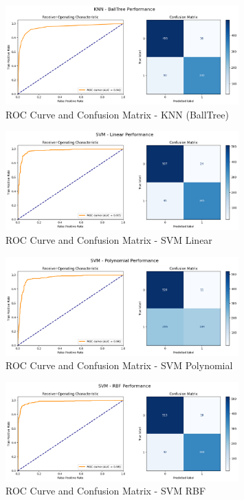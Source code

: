 \documentclass[12pt]{article}
\begin{document}
\begin{figure}[h!]
\centering
\includegraphics[width=0.8\textwidth]{images/knn6.png}
\caption{ROC Curve and Confusion Matrix - KNN (BallTree)}
\end{figure}

\begin{figure}[h!]
\centering
\includegraphics[width=0.8\textwidth]{images/svm1.png}
\caption{ROC Curve and Confusion Matrix - SVM Linear }
\end{figure}

\begin{figure}[h!]
\centering
\includegraphics[width=0.8\textwidth]{images/svm2.png}
\caption{ROC Curve and Confusion Matrix - SVM Polynomial }
\end{figure}

\begin{figure}[h!]
\centering
\includegraphics[width=0.8\textwidth]{images/svm3.png}
\caption{ROC Curve and Confusion Matrix - SVM RBF }
\end{figure}
\end{document}
